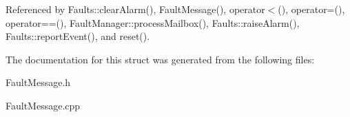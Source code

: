Referenced by Faults\+::clear\+Alarm(), Fault\+Message(), operator$<$(), operator=(), operator==(), Fault\+Manager\+::process\+Mailbox(), Faults\+::raise\+Alarm(), Faults\+::report\+Event(), and reset().



The documentation for this struct was generated from the following files\+:\begin{DoxyCompactItemize}
\item 
Fault\+Message.\+h\item 
Fault\+Message.\+cpp\end{DoxyCompactItemize}
